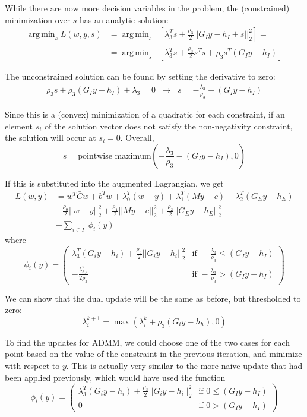 \documentclass{article}
\DeclareMathOperator*{\argmin}{arg\,min}
\begin{document}
While there are now more decision variables in the problem, the (constrained) minimization over $s$ has an analytic solution:
\begin{align*}
\argmin_s L(w, y, s)
&= \argmin_s \;\; [ \lambda_{3}^T s + \frac{\rho_3}{2} ||G_I y - h_I + s||_2^2] = \\
&= \argmin_s \;\; [ \lambda_{3}^T s + \frac{\rho_3}{2} s^T s + \rho_3 s^T (G_I y - h_I)]
\end{align*}

The unconstrained solution can be found by setting the derivative to zero:
\begin{align*}
\rho_3 s + \rho_3 (G_I y - h_I) + \lambda_3 = 0
\;\; \rightarrow \;\;
s = -\frac{\lambda_3}{\rho_3} - (G_I y - h_I)
\end{align*}

Since this is a (convex) minimization of a quadratic for each constraint, if an element $s_i$ of the solution vector does not satisfy the non-negativity constraint, the solution will occur at $s_i = 0$. Overall,
\[
s = \text{pointwise maximum}(-\frac{\lambda_3}{\rho_3} - (G_I y - h_I), 0)
\]

If this is substituted into the augmented Lagrangian, we get
\begin{align*}
L(w, y) &= w^T \bar{C} w + b^T w + \lambda_0^T (w - y) + \lambda_1^T (My - c) + \lambda_{2}^T (G_E y - h_E) \\
&+ \frac{\rho_0}{2} ||w - y||_2^2 + \frac{\rho_1}{2} ||My - c||_2^2 + \frac{\rho_2}{2} ||G_E y - h_E||_2^2 \\
&+ \sum_{i \in I} \;\phi_i(y)
\end{align*}
where
\[
\phi_i(y) =
\left(\begin{array}{ll}
\lambda_{3}^T (G_i y - h_i) +  \frac{\rho_3}{2} ||G_i y - h_i||_2^2 & \text{if  } -\frac{\lambda_3}{\rho_3} \leq (G_I y - h_I) \\
-\frac{\lambda_{3, i}^2}{2 \rho_3} & \text{if  } -\frac{\lambda_3}{\rho_3} > (G_I y - h_I)
\end{array}\right)
\] 

We can show that the dual update will be the same as before, but thresholded to zero:
\[
\lambda_i^{k+1} = \max(\lambda_i^k + \rho_3 (G_i y - h_h), 0)
\]

To find the updates for ADMM, we could choose one of the two cases for each point based on the value of the constraint in the previous iteration, and minimize with respect to $y$. This is actually very similar to the more naive update that had been applied previously, which would have used the function
\[
\phi_i(y) =
\left(\begin{array}{ll}
\lambda_{3}^T (G_i y - h_i) +  \frac{\rho_3}{2} ||G_i y - h_i||_2^2 & \text{if  } 0 \leq (G_I y - h_I) \\
0 & \text{if  } 0 > (G_I y - h_I)
\end{array}\right)
\] 
\end{document}

